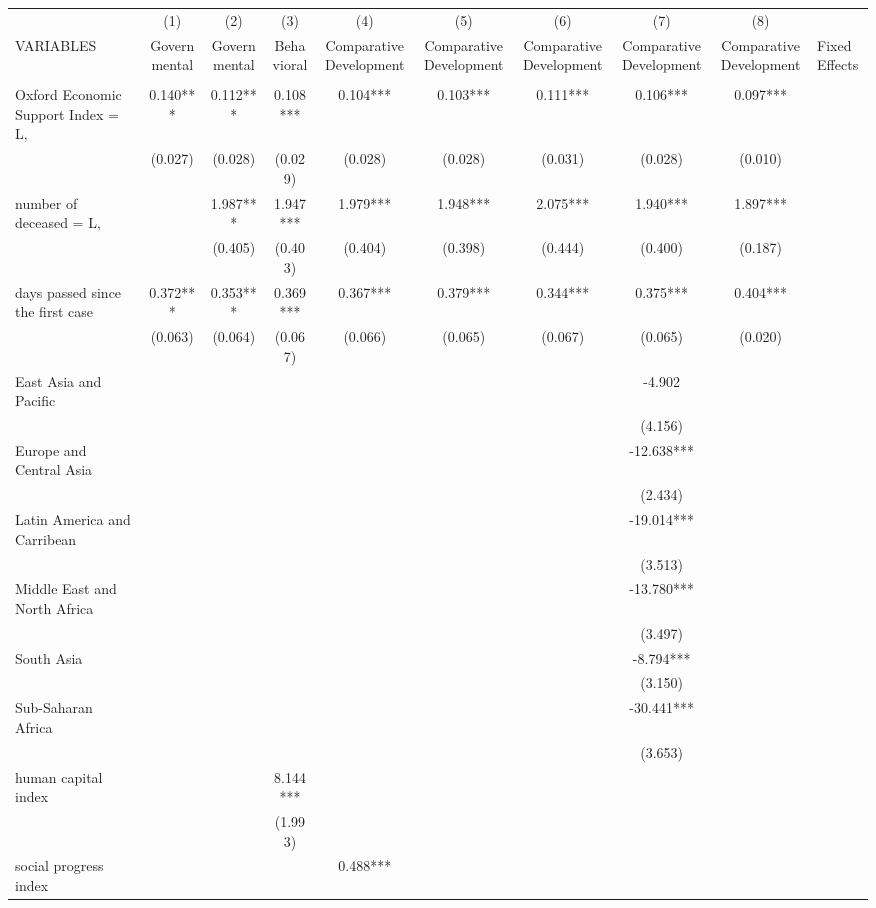\documentclass[]{article}
\begin{document}
\begin{tabular}{lcccccccc} \hline
 & (1) & (2) & (3) & (4) & (5) & (6) & (7) & (8) \\
VARIABLES & Governmental & Governmental & Behavioral & Comparative Development & Comparative Development & Comparative Development & Comparative Development & Comparative Development & Fixed Effects \\ \hline
 &  &  &  &  &  &  &  &  \\
Oxford Economic Support Index = L, & 0.140*** & 0.112*** & 0.108*** & 0.104*** & 0.103*** & 0.111*** & 0.106*** & 0.097*** \\
 & (0.027) & (0.028) & (0.029) & (0.028) & (0.028) & (0.031) & (0.028) & (0.010) \\
number of deceased = L, &  & 1.987*** & 1.947*** & 1.979*** & 1.948*** & 2.075*** & 1.940*** & 1.897*** \\
 &  & (0.405) & (0.403) & (0.404) & (0.398) & (0.444) & (0.400) & (0.187) \\
days passed since the first case & 0.372*** & 0.353*** & 0.369*** & 0.367*** & 0.379*** & 0.344*** & 0.375*** & 0.404*** \\
 & (0.063) & (0.064) & (0.067) & (0.066) & (0.065) & (0.067) & (0.065) & (0.020) \\
East Asia and Pacific &  &  &  &  &  &  & -4.902 &  \\
 &  &  &  &  &  &  & (4.156) &  \\
Europe and Central Asia &  &  &  &  &  &  & -12.638*** &  \\
 &  &  &  &  &  &  & (2.434) &  \\
Latin America and Carribean &  &  &  &  &  &  & -19.014*** &  \\
 &  &  &  &  &  &  & (3.513) &  \\
Middle East and North Africa &  &  &  &  &  &  & -13.780*** &  \\
 &  &  &  &  &  &  & (3.497) &  \\
South Asia &  &  &  &  &  &  & -8.794*** &  \\
 &  &  &  &  &  &  & (3.150) &  \\
Sub-Saharan Africa &  &  &  &  &  &  & -30.441*** &  \\
 &  &  &  &  &  &  & (3.653) &  \\
human capital index &  &  & 8.144*** &  &  &  &  &  \\
 &  &  & (1.993) &  &  &  &  &  \\
social progress index &  &  &  & 0.488*** &  &  &  &  \\

\end{tabular}
\end{document}
